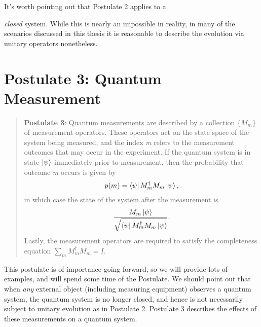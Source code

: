 It's worth pointing out that Postulate 2 applies to a {\emph{closed} system.  While this is nearly an impossible in reality, in many of the scenarios discussed in this thesis it is reasonable to describe the evolution via unitary operators nonetheless.





\pagebreak
\section{Postulate 3: Quantum Measurement}



\begin{quote}
    \textbf{Postulate 3}: Quantum measurements are described by a collection $\{M_m\}$ of measurement operators. These operators act on the state space of the system being measured, and the index {\emph{m}} refers to the measurement outcomes that may occur in the experiment. If the quantum system is in state $\ket{\psi}$ immediately prior to measurement, then the probability that outcome {\emph{m}} occurs is given by 
    \begin{gather*}
        p(m)=\bra{\psi}M_m^\dagger M_m \ket{\psi},
    \end{gather*}
    in which case the state of the system after the measurement is
    \begin{gather*}
        \frac{M_m \ket{\psi}}{\sqrt{\bra{\psi}M_m^\dagger M_m \ket{\psi}}}.
    \end{gather*}
Lastly, the measurement operators are required to satisfy the completeness equation $\sum\limits_m M_m^\dagger M_m =I$.
\end{quote}


This postulate is of importance going forward, so we will provide lots of examples, and will spend some time of the Postulate.  We should point out that when {\emph{any}} external object (including measuring equipment) observes a quantum system, the quantum system is no longer closed, and hence is not necessarily subject to unitary evolution as in Postulate 2. Postulate 3 describes the effects of these measurements on a quantum system. 

}
